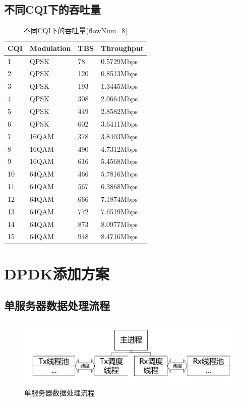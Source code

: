 \documentclass{article}
\begin{document}
\subsection{不同CQI下的吞吐量}
\begin{table}[H]
\caption{不同CQI下的吞吐量(flowNum=8)}
\centering
\begin{tabular}{|l|l|l|l|}%
	\hline  %
	CQI &	Modulation	&	TBS	&	Throughput	\\
	\hline
	1	&	QPSK		&	78	&	0.5729Mbps	\\
	\hline
	2	&	QPSK		&	120	&	0.8513Mbps	\\
	\hline
	3	&	QPSK		&	193	&	1.3445Mbps	\\
	\hline
	4	&	QPSK		&	308	&	2.0664Mbps	\\
	\hline
	5	&	QPSK		&	449	&	2.8582Mbps	\\
	\hline
	6	&	QPSK		&	602	&	3.6411Mbps	\\
	\hline
	7	&	16QAM		&	378	&	3.8403Mbps	\\
	\hline
	8	&	16QAM		&	490	&	4.7312Mbps	\\
	\hline
	9	&	16QAM		&	616	&	5.4568Mbps	\\
	\hline
	10	&	64QAM		&	466	&	5.7816Mbps	\\
	\hline
	11	&	64QAM		&	567	&	6.3868Mbps	\\
	\hline
	12	&	64QAM		&	666	&	7.1874Mbps	\\
	\hline
	13	&	64QAM		&	772	&	7.6519Mbps	\\
	\hline
	14	&	64QAM		&	873	&	8.0977Mbps	\\
	\hline
	15	&	64QAM		&	948	&	8.4716Mbps	\\
	\hline  %
\end{tabular}
\end{table}

\section{DPDK添加方案}

\subsection{单服务器数据处理流程}
\begin{figure}[H]
	\centering
	\includegraphics[width = \textwidth]{frame_step1.pdf}
	\caption{单服务器数据处理流程}
\end{figure}
\end{document}
